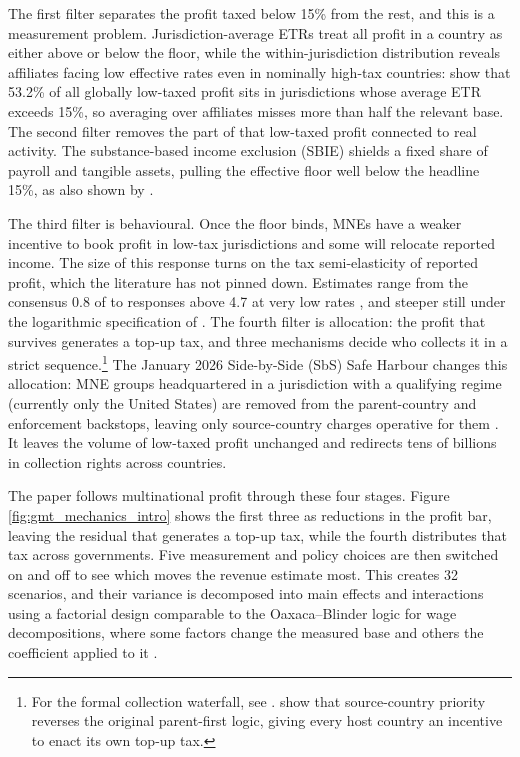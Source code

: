 \documentclass[11pt,a4paper]{article}
\begin{document}
The first filter separates the profit taxed below 15\% from the rest, and this is a measurement problem. Jurisdiction-average ETRs treat all profit in a country as either above or below the floor, while the within-jurisdiction distribution reveals affiliates facing low effective rates even in nominally high-tax countries: \citet{hugger2026} show that 53.2\% of all globally low-taxed profit sits in jurisdictions whose average ETR exceeds 15\%, so averaging over affiliates misses more than half the relevant base. The second filter removes the part of that low-taxed profit connected to real activity. The substance-based income exclusion (SBIE) shields a fixed share of payroll and tangible assets, pulling the effective floor well below the headline 15\%, as also shown by \citet{devereux2023}. 

The third filter is behavioural. Once the floor binds, MNEs have a weaker incentive to book profit in low-tax jurisdictions and some will relocate reported income. The size of this response turns on the tax semi-elasticity of reported profit, which the literature has not pinned down. Estimates range from the consensus 0.8 of \citet{heckemeyer2017} to responses above 4.7 at very low rates \citep{dowd2017}, and steeper still under the logarithmic specification of \citet{garcia-bernardo2024}. The fourth filter is allocation: the profit that survives generates a top-up tax, and three mechanisms decide who collects it in a strict sequence.\footnote{For the formal collection waterfall, see \citet{oecd2025}. \citet{devereux2022} show that source-country priority reverses the original parent-first logic, giving every host country an incentive to enact its own top-up tax.} The January 2026 Side-by-Side (SbS) Safe Harbour changes this allocation: MNE groups headquartered in a jurisdiction with a qualifying regime (currently only the United States) are removed from the parent-country and enforcement backstops, leaving only source-country charges operative for them \citep{oecd2026}. It leaves the volume of low-taxed profit unchanged and redirects tens of billions in collection rights across countries.

The paper follows multinational profit through these four stages. Figure \ref{fig:gmt_mechanics_intro} shows the first three as reductions in the profit bar, leaving the residual that generates a top-up tax, while the fourth distributes that tax across governments. Five measurement and policy choices are then switched on and off to see which moves the revenue estimate most. This creates 32 scenarios, and their variance is decomposed into main effects and interactions using a factorial design comparable to the Oaxaca--Blinder logic for wage decompositions, where some factors change the measured base and others the coefficient applied to it \citep{oaxaca1973,blinder1973,shorrocks2013}.
\end{document}
